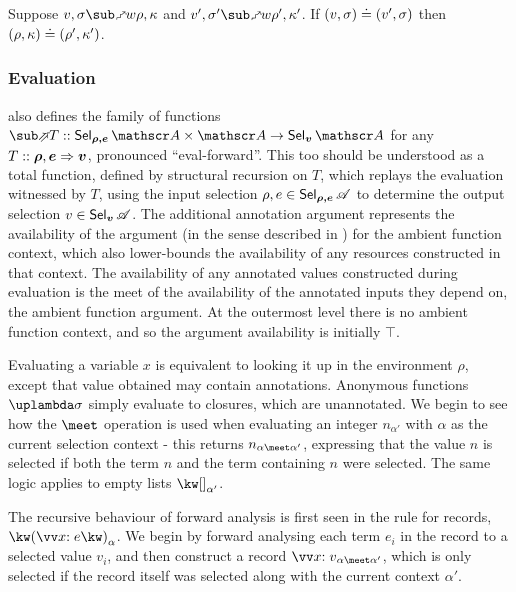\begin{lemma}
   Suppose $v, \sigma \matchFwdR{w} \rho, \kappa$ and $v', \sigma' \matchFwdR{w} \rho', \kappa'$. If $(v, \sigma) \doteq (v', \sigma)$ then $(\rho, \kappa) \doteq (\rho', \kappa')$.
\end{lemma}

\subsubsection{Evaluation}

 also defines the family of functions $\evalFwdF{T} :: \Prod{\Sel{\rho, e}{A}}{\Ann{A}} \to \Sel{v}{A}$ for any $T :: \bm{\rho}, \bm{e} \Rightarrow \bm{v}$, pronounced ``eval-forward''. This too should be understood as a total function, defined by structural recursion on $T$, which replays the evaluation witnessed by $T$, using the input selection $\rho, e \in \textup{\textsf{Sel}}_{\bm{\rho,e}}\,{\mathscr{A}}$ to determine the output selection $v \in \textup{\textsf{Sel}}_{\bm{v}}\,{\mathscr{A}}$. The additional annotation argument represents the availability of the argument (in the sense described in ) for the ambient function context, which also lower-bounds the availability of any resources constructed in that context. The availability of any annotated values constructed during evaluation is the meet of the availability of the annotated inputs they depend on, the ambient function argument. At the outermost level there is no ambient function context, and so the argument availability is initially $\top$.

Evaluating a variable $x$ is equivalent to looking it up in the environment $\rho$, except that value obtained may contain annotations. Anonymous functions $\exLambda{\sigma}$ simply evaluate to closures, which are unannotated. We begin to see how the $\meet$ operation is used when evaluating an integer $n_{\alpha'}$ with $\alpha$ as the current selection context - this returns $\annot{n}{\alpha \meet \alpha'}$, expressing that the value $n$ is selected if both the term $n$ and the term containing $n$ were selected. The same logic applies to empty lists $\annot{\exNil}{\alpha'}$.

The recursive behaviour of forward analysis is first seen in the rule for records, $\exRec{\vec{\bind{x}{e}}}_{\alpha}$. We begin by forward analysing each term $e_i$ in the record to a selected value $v_i$, and then construct a record $\annot{\vec{\bind{x}{v}}}{\alpha \meet \alpha'}$, which is only selected if the record itself was selected along with the current context $\alpha'$.


